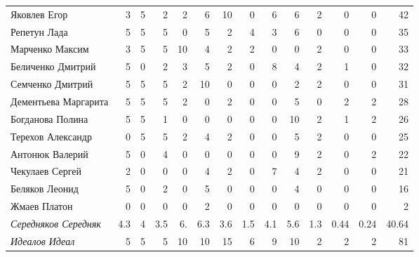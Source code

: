 \documentclass[12pt]{article}
\newlength{\h}
\newlength{\x}
\begin{document}
\begin{small}
\begin{center}
\begin{tabular}{lrrrrrrrrrrrrr}
  Яковлев Егор           &    3  &  5  &    2  &   2  &    6  &   10  &    0  &    6  &    6  &    2  &     0  &     0  &     42  \\
  Репетун Лада           &    5  &  5  &    5  &   0  &    5  &    2  &    4  &    3  &    6  &    0  &     0  &     0  &     35  \\
  Марченко Максим        &    3  &  5  &    5  &  10  &    4  &    2  &    2  &    0  &    0  &    2  &     0  &     0  &     33  \\
  Беличенко Дмитрий      &    5  &  0  &    2  &   3  &    5  &    2  &    0  &    8  &    4  &    2  &     1  &     0  &     32  \\
  Семченко Дмитрий       &    5  &  5  &    5  &   2  &   10  &    0  &    0  &    0  &    2  &    2  &     0  &     0  &     31  \\
  Дементьева Маргарита   &    5  &  5  &    5  &   2  &    0  &    2  &    0  &    0  &    5  &    0  &     2  &     2  &     28  \\
  Богданова Полина       &    5  &  5  &    1  &   0  &    0  &    0  &    0  &    0  &   10  &    2  &     1  &     2  &     26  \\
  Терехов Александр      &    0  &  5  &    5  &   2  &    4  &    2  &    0  &    0  &    5  &    2  &     0  &     0  &     25  \\
  Антонюк Валерий        &    5  &  0  &    4  &   0  &    0  &    0  &    0  &    0  &    9  &    2  &     0  &     2  &     22  \\
  Чекулаев Сергей        &    2  &  0  &    0  &   0  &    4  &    2  &    0  &    7  &    4  &    2  &     0  &     0  &     21  \\
  Беляков Леонид         &    5  &  0  &    2  &   0  &    5  &    0  &    0  &    0  &    4  &    0  &     0  &     0  &     16  \\
  Жмаев Платон           &    0  &  0  &    0  &   0  &    2  &    0  &    0  &    0  &    0  &    0  &     0  &     0  &      2  \\
  \hline
  \textit{Середняков Середняк}    &  4.3  &  4  &  3.5  &  6.  &  6.3  &  3.6  &  1.5  &  4.1  &  5.6  &  1.3  &  0.44  &  0.24  &  40.64  \\
  \textit{Идеалов Идеал}          &    5  &  5  &    5  &  10  &   10  &   15  &    6  &    9  &   10  &    2  &     2  &     2  &     81  \\
  \hline
\end{tabular}
\end{center}
\end{small}
\end{document}
